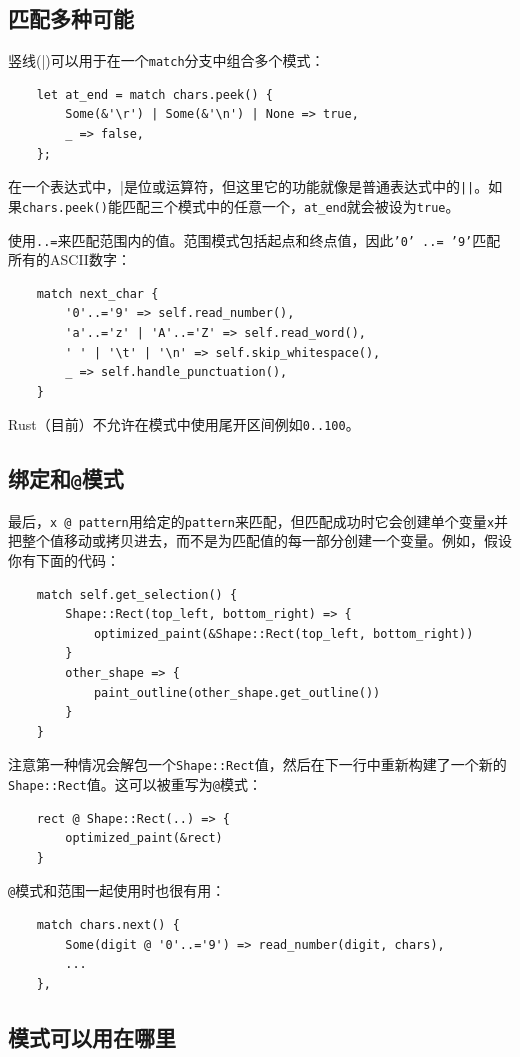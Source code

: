 \subsection{匹配多种可能}
竖线(|)可以用于在一个\texttt{match}分支中组合多个模式：
\begin{verbatim}
    let at_end = match chars.peek() {
        Some(&'\r') | Some(&'\n') | None => true,
        _ => false,
    };
\end{verbatim}

在一个表达式中，|是位或运算符，但这里它的功能就像是普通表达式中的\texttt{||}。如果\texttt{chars.peek()}能匹配三个模式中的任意一个，\texttt{at\_end}就会被设为\texttt{true}。

使用\texttt{..=}来匹配范围内的值。范围模式包括起点和终点值，因此\texttt{'0' ..= '9'}匹配所有的ASCII数字：
\begin{verbatim}
    match next_char {
        '0'..='9' => self.read_number(),
        'a'..='z' | 'A'..='Z' => self.read_word(),
        ' ' | '\t' | '\n' => self.skip_whitespace(),
        _ => self.handle_punctuation(),
    }
\end{verbatim}

Rust（目前）不允许在模式中使用尾开区间例如\texttt{0..100}。

\subsection{绑定和\texttt{@}模式}
最后，\texttt{x @ pattern}用给定的\texttt{pattern}来匹配，但匹配成功时它会创建单个变量\texttt{x}并把整个值移动或拷贝进去，而不是为匹配值的每一部分创建一个变量。例如，假设你有下面的代码：
\begin{verbatim}
    match self.get_selection() {
        Shape::Rect(top_left, bottom_right) => {
            optimized_paint(&Shape::Rect(top_left, bottom_right))
        }
        other_shape => {
            paint_outline(other_shape.get_outline())
        }
    }    
\end{verbatim}
注意第一种情况会解包一个\texttt{Shape::Rect}值，然后在下一行中重新构建了一个新的\texttt{Shape::Rect}值。这可以被重写为\texttt{@}模式：
\begin{verbatim}
    rect @ Shape::Rect(..) => {
        optimized_paint(&rect)
    }
\end{verbatim}

\texttt{@}模式和范围一起使用时也很有用：
\begin{verbatim}
    match chars.next() {
        Some(digit @ '0'..='9') => read_number(digit, chars),
        ...
    },
\end{verbatim}

\subsection{模式可以用在哪里}














